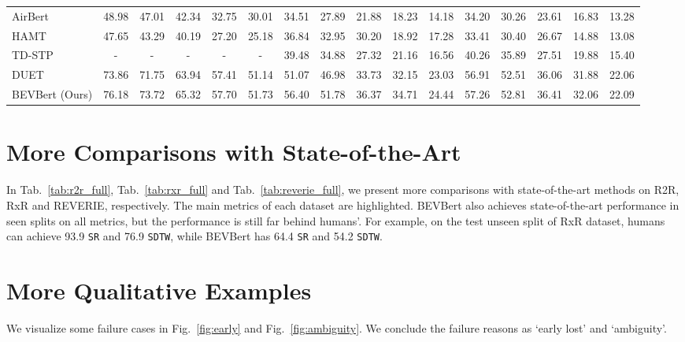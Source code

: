 \begin{table*}[h]
{\begin{tabular}{l ccccc | ccccc | ccccc }
AirBert~\cite{guhur2021airbert}
& 48.98 & 47.01 & 42.34 & 32.75 & 30.01
& 34.51 & 27.89 & 21.88 & 18.23 & 14.18 
& 34.20 & 30.26 & 23.61 & 16.83 & 13.28 \\
HAMT~\cite{chen2021history} 
& 47.65 & 43.29 & 40.19 & 27.20 & 25.18
& 36.84 & 32.95 & 30.20 & 18.92 & 17.28 
& 33.41 & 30.40 & 26.67 & 14.88 & 13.08 \\ 
TD-STP~\cite{zhao2022target} 
& - & - & - & - & -
& 39.48 & 34.88 & 27.32 & 21.16 & 16.56 
& 40.26 & 35.89 & 27.51 & 19.88 & 15.40 \\ 
DUET~\cite{chen2022think} 
& 73.86 & 71.75 & 63.94 & 57.41 & 51.14
& 51.07 & 46.98 & 33.73 & 32.15 & 23.03 
& 56.91 & 52.51 & 36.06 & 31.88 & 22.06 \\
BEVBert (Ours) 
& \color{blue}76.18 & \color{blue}73.72 & \color{blue}65.32 & \color{blue}57.70 & \color{blue}51.73
& \color{blue}56.40 & \color{blue}51.78 & \color{blue}36.37 & \color{blue}34.71 & \color{blue}24.44 
& \color{blue}57.26 & \color{blue}52.81 & \color{blue}36.41 & \color{blue}32.06 & \color{blue}22.09 \\
\bottomrule
\end{tabular}}
\vspace{-2.5mm}
\caption{Comparison with state-of-the-art methods on REVERIE dataset.}\label{tab:reverie_full}
\end{table*}
\section{More Comparisons with State-of-the-Art}\label{sec:sup_sota}
In Tab.~\ref{tab:r2r_full}, Tab.~\ref{tab:rxr_full} and Tab.~\ref{tab:reverie_full}, we present more comparisons with state-of-the-art methods on R2R, RxR and REVERIE, respectively. The main metrics of each dataset are highlighted. 
BEVBert also achieves state-of-the-art performance in seen splits on all metrics, but the performance is still far behind humans'.
For example, on the test unseen split of RxR dataset, humans can achieve 93.9 \texttt{SR} and 76.9 \texttt{SDTW}, while BEVBert has 64.4 \texttt{SR} and 54.2 \texttt{SDTW}.





\section{More Qualitative Examples}\label{sec:sup_viz}
We visualize some failure cases in Fig.~\ref{fig:early} and Fig.~\ref{fig:ambiguity}. We conclude the failure reasons as `early lost' and `ambiguity'.


